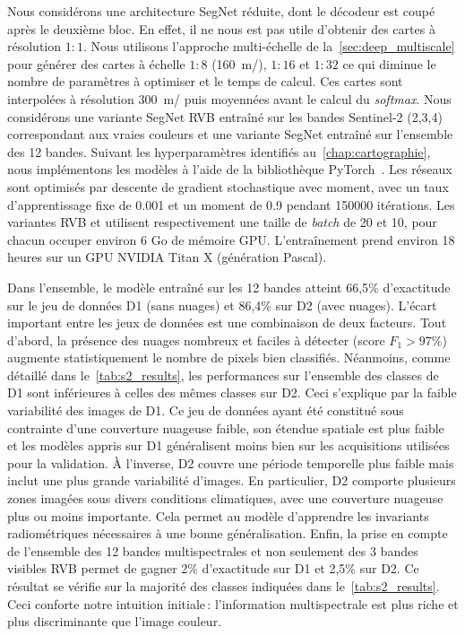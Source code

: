 Nous considérons une architecture SegNet réduite, dont le décodeur est coupé après le deuxième bloc. En effet, il ne nous est pas utile d'obtenir des cartes à résolution $1:1$. Nous utilisons l'approche multi-échelle de la~\cref{sec:deep_multiscale} pour générer des cartes à échelle $1:8$ (\SI{160}{\meter/\px}), $1:16$ et $1:32$ ce qui diminue le nombre de paramètres à optimiser et le temps de calcul. Ces cartes sont interpolées à résolution \SI{300}{\meter/\px} puis moyennées avant le calcul du \emph{softmax}. Nous considérons une variante SegNet \gls{RVB} entraîné sur les bandes Sentinel-2 (2,3,4) correspondant aux vraies couleurs et une variante SegNet  entraîné sur l'ensemble des 12 bandes. Suivant les hyperparamètres identifiés au~\cref{chap:cartographie}, nous implémentons les modèles à l'aide de la bibliothèque \gls{PyTorch}~\cite{noauthor_pytorch_2016}. Les réseaux sont optimisés par descente de gradient stochastique avec moment, avec un taux d'apprentissage fixe de \num{0,001} et un moment de \num{0,9} pendant \num{150000} itérations. Les variantes \gls{RVB} et  utilisent respectivement une taille de \emph{batch} de 20 et 10, pour chacun occuper environ 6 Go de mémoire \gls{GPU}. L'entraînement prend environ 18 heures sur un \gls{GPU} NVIDIA Titan X (génération Pascal).

Dans l'ensemble, le modèle entraîné sur les 12 bandes atteint 66,5\% d'exactitude sur le jeu de données D1 (sans nuages) et 86,4\% sur D2 (avec nuages). L'écart important entre les jeux de données est une combinaison de deux facteurs. Tout d'abord, la présence des nuages nombreux et faciles à détecter (score $F_1 > 97\%$) augmente statistiquement le nombre de pixels bien classifiés. Néanmoins, comme détaillé dans le~\cref{tab:s2_results}, les performances sur l'ensemble des classes de D1 sont inférieures à celles des mêmes classes sur D2. Ceci s'explique par la faible variabilité des images de D1. Ce jeu de données ayant été constitué sous contrainte d'une couverture nuageuse faible, son étendue spatiale est plus faible et les modèles appris sur D1 généralisent moins bien sur les acquisitions utilisées pour la validation. À l'inverse, D2 couvre une période temporelle plus faible mais inclut une plus grande variabilité d'images. En particulier, D2 comporte plusieurs zones imagées sous divers conditions climatiques, avec une couverture nuageuse plus ou moins importante. Cela permet au modèle d'apprendre les invariants radiométriques nécessaires à une bonne généralisation.
Enfin, la prise en compte de l'ensemble des 12 bandes multispectrales et non seulement des 3 bandes visibles \gls{RVB} permet de gagner 2\% d'exactitude sur D1 et 2,5\% sur D2. Ce résultat se vérifie sur la majorité des classes indiquées dans le~\cref{tab:s2_results}. Ceci conforte notre intuition initiale\,: l'information multispectrale est plus riche et plus discriminante que l'image couleur.

